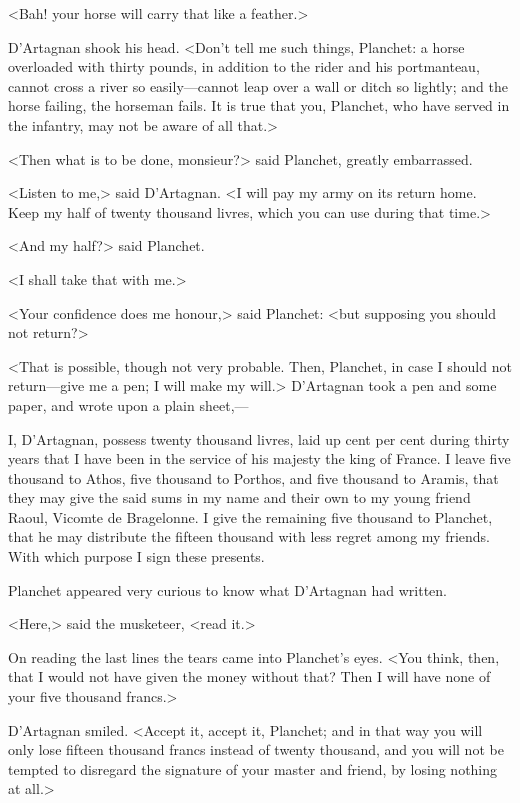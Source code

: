 <Bah! your horse will carry that like a feather.>

D'Artagnan shook his head. <Don't tell me such things, Planchet: a horse overloaded with thirty pounds, in addition to the rider and his portmanteau, cannot cross a river so easily—cannot leap over a wall or ditch so lightly; and the horse failing, the horseman fails. It is true that you, Planchet, who have served in the infantry, may not be aware of all that.>

<Then what is to be done, monsieur?> said Planchet, greatly embarrassed.

<Listen to me,> said D'Artagnan. <I will pay my army on its return home. Keep my half of twenty thousand livres, which you can use during that time.>

<And my half?> said Planchet.

<I shall take that with me.>

<Your confidence does me honour,> said Planchet: <but supposing you should not return?>

<That is possible, though not very probable. Then, Planchet, in case I should not return—give me a pen; I will make my will.> D'Artagnan took a pen and some paper, and wrote upon a plain sheet,—
\begin{mail}{}{}
I, D'Artagnan, possess twenty thousand livres, laid up cent per cent during thirty years that I have been in the service of his majesty the king of France. I leave five thousand to Athos, five thousand to Porthos, and five thousand to Aramis, that they may give the said sums in my name and their own to my young friend Raoul, Vicomte de Bragelonne. I give the remaining five thousand to Planchet, that he may distribute the fifteen thousand with less regret among my friends. With which purpose I sign these presents.
\end{mail}

Planchet appeared very curious to know what D'Artagnan had written.

<Here,> said the musketeer, <read it.>

On reading the last lines the tears came into Planchet's eyes. <You think, then, that I would not have given the money without that? Then I will have none of your five thousand francs.>

D'Artagnan smiled. <Accept it, accept it, Planchet; and in that way you will only lose fifteen thousand francs instead of twenty thousand, and you will not be tempted to disregard the signature of your master and friend, by losing nothing at all.>

